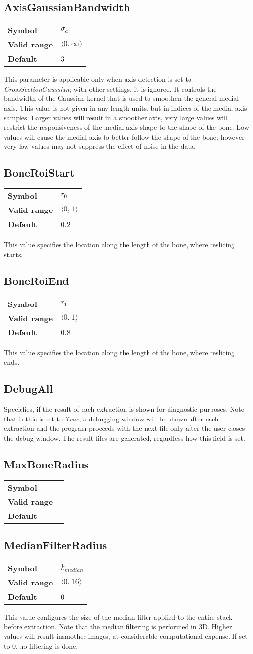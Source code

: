 \documentclass[11pt,twoside,a4paper,titlepage]{report}
\newcommand{\valref}[3]{
	\begin{table}[h!]
	\begin{tabular}{l l}
		\textbf{Symbol} & #1\\
		\textbf{Valid range} & #2\\
		\textbf{Default} & #3
	\end{tabular}
	\end{table} 
}
\begin{document}
\subsection{AxisGaussianBandwidth}
\valref{\(\sigma_a\)}{\(\langle 0, \infty )\)}{3}
This parameter is applicable only when axis detection is set to \emph{CrossSectionGaussian}; with other settings, it is ignored.
It controls the bandwidth of the Gaussian kernel that is used to smoothen the general medial axis.
This value is not given in any length units, but in indices of the medial axis samples.
Larger values will result in a smoother axis, very large values will restrict the responsiveness of the medial axis shape to the shape of the bone.
Low values will cause the medial axis to better follow the shape of the bone; however very low values may not suppress the effect of noise in the data.

\subsection{BoneRoiStart}
\valref{\(r_0\)}{\(\langle 0, 1 \rangle\)}{0.2}
This value specifies the location along the length of the bone, where reslicing starts.

\subsection{BoneRoiEnd}
\valref{\(r_1\)}{\(\langle 0, 1 \rangle\)}{0.8}
This value specifies the location along the length of the bone, where reslicing ends.

\subsection{DebugAll}
Speciefies, if the result of each extraction is shown for diagnostic purposes.
Note that is this is set to \emph{True}, a debugging window will be shown after each extraction and the program proceeds with the next file only after the user closes the debug window.
The result files are generated, regardless how this field is set.

\subsection{MaxBoneRadius}
\valref{}{}{}

\subsection{MedianFilterRadius}
\valref{\(k_{median}\)}{\(\langle 0, 16 \rangle\)}{0}
This value configures the size of the median filter applied to the entire stack before extraction.
Note that the median filtering is performed in 3D.
Higher values will result insmother images, at considerable computational expense.
If set to 0, no filtering is done.
\end{document}

